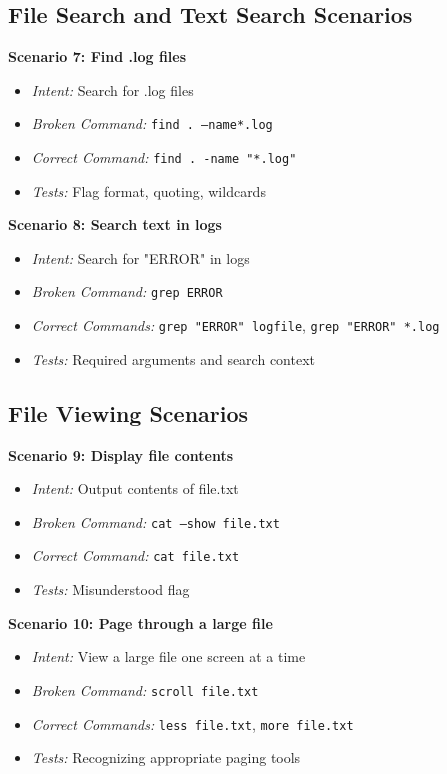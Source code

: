 \subsection{File Search and Text Search Scenarios}

\textbf{Scenario 7: Find .log files}
\begin{itemize}
	\item \textit{Intent:} Search for .log files
	\item \textit{Broken Command:} \texttt{find . --name*.log}
	\item \textit{Correct Command:} \texttt{find . -name "*.log"}
	\item \textit{Tests:} Flag format, quoting, wildcards
\end{itemize}

\textbf{Scenario 8: Search text in logs}
\begin{itemize}
	\item \textit{Intent:} Search for "ERROR" in logs
	\item \textit{Broken Command:} \texttt{grep ERROR}
	\item \textit{Correct Commands:} \texttt{grep "ERROR" logfile}, \texttt{grep "ERROR" *.log}
	\item \textit{Tests:} Required arguments and search context
\end{itemize}

\subsection{File Viewing Scenarios}

\textbf{Scenario 9: Display file contents}
\begin{itemize}
	\item \textit{Intent:} Output contents of file.txt
	\item \textit{Broken Command:} \texttt{cat --show file.txt}
	\item \textit{Correct Command:} \texttt{cat file.txt}
	\item \textit{Tests:} Misunderstood flag
\end{itemize}

\textbf{Scenario 10: Page through a large file}
\begin{itemize}
	\item \textit{Intent:} View a large file one screen at a time
	\item \textit{Broken Command:} \texttt{scroll file.txt}
	\item \textit{Correct Commands:} \texttt{less file.txt}, \texttt{more file.txt}
	\item \textit{Tests:} Recognizing appropriate paging tools
\end{itemize}

